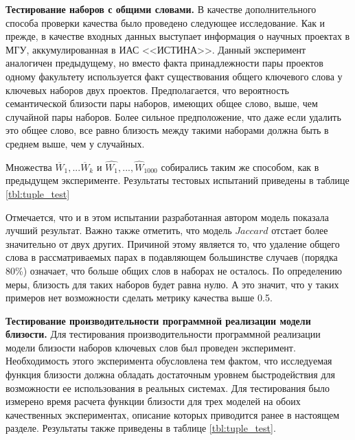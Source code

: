 \textbf{Тестирование наборов с общими словами.}
В качестве дополнительного способа проверки качества было проведено следующее исследование. Как и прежде, в качестве входных данных выступает информация о научных проектах в МГУ, аккумулированная в ИАС <<ИСТИНА>>. Данный эксперимент аналогичен предыдущему, но вместо факта принадлежности пары проектов одному факультету используется факт существования общего ключевого слова у ключевых наборов двух проектов. Предполагается, что вероятность семантической близости пары наборов, имеющих общее слово, выше, чем случайной пары наборов. Более сильное предположение, что даже если удалить это общее слово, все равно близость между такими наборами должна быть в среднем выше, чем у случайных.

Множества $\overline{W}_{1}, ... \overline{W}_{k}$ и $\hat{W_1}, ..., \hat{W}_{1000}$ собирались таким же способом, как в предыдущем эксперименте. Результаты тестовых испытаний приведены в таблице \ref{tbl:tuple_test}

Отмечается, что и в этом испытании разработанная автором модель показала лучший результат. Важно также отметить, что модель $Jaccard$ отстает более значительно от двух других. Причиной этому является то, что удаление общего слова в рассматриваемых парах в подавляющем большинстве случаев (порядка 80\%) означает, что больше общих слов в наборах не осталось. По определению меры, близость для таких наборов будет равна нулю. А это значит, что у таких примеров нет возможности сделать метрику качества выше 0.5.

\textbf{Тестирование производительности программной реализации модели близости.}
Для тестирования производительности программной реализации модели близости наборов ключевых слов был проведен эксперимент. Необходимость этого эксперимента обусловлена тем фактом, что исследуемая функция близости должна обладать достаточным уровнем быстродействия для возможности ее использования в реальных системах. Для тестирования было измерено время расчета функции близости для трех моделей на обоих качественных экспериментах, описание которых приводится ранее в настоящем разделе. Результаты также приведены в таблице \ref{tbl:tuple_test}.

